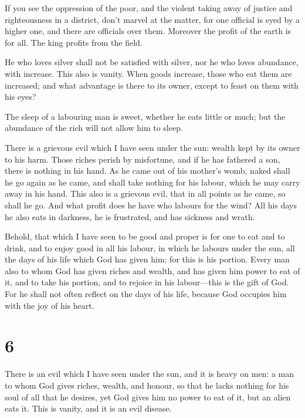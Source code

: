  If you see the oppression of the poor, and the violent
taking away of justice and righteousness in a district, don't marvel at
the matter, for one official is eyed by a higher one, and there are
officials over them.  Moreover the profit of the earth is
for all. The king profits from the field.

 He who loves silver shall not be satisfied with silver,
nor he who loves abundance, with increase. This also is vanity.
 When goods increase, those who eat them are increased; and
what advantage is there to its owner, except to feast on them with his
eyes?

 The sleep of a labouring man is sweet, whether he eats
little or much; but the abundance of the rich will not allow him to
sleep.

 There is a grievous evil which I have seen under the sun:
wealth kept by its owner to his harm.  Those riches perish
by misfortune, and if he has fathered a son, there is nothing in his
hand.  As he came out of his mother's womb, naked shall he
go again as he came, and shall take nothing for his labour, which he may
carry away in his hand.  This also is a grievous evil, that
in all points as he came, so shall he go. And what profit does he have
who labours for the wind?  All his days he also eats in
darkness, he is frustrated, and has sickness and wrath.

 Behold, that which I have seen to be good and proper is
for one to eat and to drink, and to enjoy good in all his labour, in
which he labours under the sun, all the days of his life which God has
given him; for this is his portion.  Every man also to whom
God has given riches and wealth, and has given him power to eat of it,
and to take his portion, and to rejoice in his labour---this is the gift
of God.  For he shall not often reflect on the days of his
life, because God occupies him with the joy of his heart.

\hypertarget{section-5}{%
\section{6}\label{section-5}}

 There is an evil which I have seen under the sun, and it is
heavy on men:  a man to whom God gives riches, wealth, and
honour, so that he lacks nothing for his soul of all that he desires,
yet God gives him no power to eat of it, but an alien eats it. This is
vanity, and it is an evil disease.

